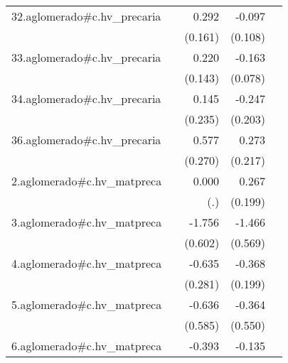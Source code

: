 {\begin{longtable}{l*{4}{D{.}{.}{-1}}}
\addlinespace
32.aglomerado#c.hv\_precaria&                     &       0.292         &      -0.097         &                     \\
            &                     &     (0.161)         &     (0.108)         &                     \\
\addlinespace
33.aglomerado#c.hv\_precaria&                     &       0.220         &      -0.163\sym{*}  &                     \\
            &                     &     (0.143)         &     (0.078)         &                     \\
\addlinespace
34.aglomerado#c.hv\_precaria&                     &       0.145         &      -0.247         &                     \\
            &                     &     (0.235)         &     (0.203)         &                     \\
\addlinespace
36.aglomerado#c.hv\_precaria&                     &       0.577\sym{*}  &       0.273         &                     \\
            &                     &     (0.270)         &     (0.217)         &                     \\
\addlinespace
2.aglomerado#c.hv\_matpreca&                     &       0.000         &       0.267         &                     \\
            &                     &         (.)         &     (0.199)         &                     \\
\addlinespace
3.aglomerado#c.hv\_matpreca&                     &      -1.756\sym{**} &      -1.466\sym{**} &                     \\
            &                     &     (0.602)         &     (0.569)         &                     \\
\addlinespace
4.aglomerado#c.hv\_matpreca&                     &      -0.635\sym{*}  &      -0.368         &                     \\
            &                     &     (0.281)         &     (0.199)         &                     \\
\addlinespace
5.aglomerado#c.hv\_matpreca&                     &      -0.636         &      -0.364         &                     \\
            &                     &     (0.585)         &     (0.550)         &                     \\
\addlinespace
6.aglomerado#c.hv\_matpreca&                     &      -0.393         &      -0.135         &                     \\

\end{longtable}}

